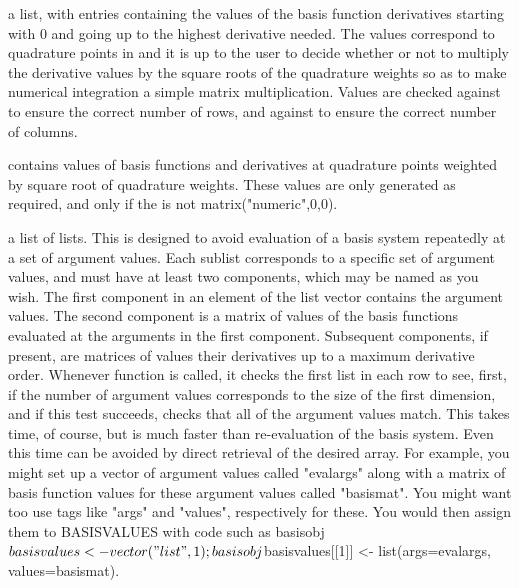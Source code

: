 \begin{Arguments}
\begin{ldescription}
\item[\code{values}] a list, with entries containing the values of the basis function
derivatives starting with 0 and going up to the highest derivative
needed.  The values correspond to quadrature points in
 and it is up to the user to decide whether or not to
multiply the derivative values by the square roots of the quadrature
weights so as to make numerical integration a simple matrix
multiplication.  Values are checked against  to
ensure the correct number of rows, and against  to
ensure the correct number of columns.

 contains values of basis functions and derivatives at
quadrature points weighted by square root of quadrature weights.
These values are only generated as required, and only if the
 is not matrix("numeric",0,0).

\item[\code{basisvalues}] a list of lists.  This is designed to avoid evaluation of a basis
system repeatedly at a set of argument values. Each sublist
corresponds to a specific set of argument values, and must have at
least two components, which may be named as you wish.  The first
component in an element of the list vector contains the argument
values.  The second component is a matrix of values of the basis
functions evaluated at the arguments in the first component.
Subsequent components, if present, are matrices of values their
derivatives up to a maximum derivative order.  Whenever function
 is called, it checks the first list in each
row to see, first, if the number of argument values corresponds to
the size of the first dimension, and if this test succeeds, checks
that all of the argument values match.  This takes time, of course,
but is much faster than re-evaluation of the basis system.  Even
this time can be avoided by direct retrieval of the desired array.
For example, you might set up a vector of argument values called
"evalargs" along with a matrix of basis function values for these
argument values called "basismat".  You might want too use tags like
"args" and "values", respectively for these.  You would then assign
them to BASISVALUES with code such as basisobj$basisvalues <-
vector("list",1);  basisobj$basisvalues[[1]] <- list(args=evalargs,
values=basismat).

\end{ldescription}
\end{Arguments}
